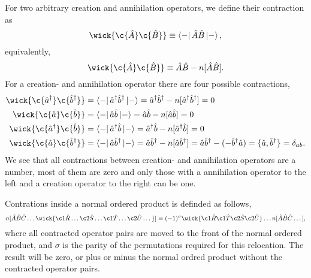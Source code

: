         For two arbitrary creation and annihilation operators, we define their contraction
        as 
        \begin{equation}
            \wick{\c {\hat{A}} \c {\hat{B}} } \equiv \bra{-} \hat{A} \hat{B}\ket{-},
        \end{equation}
        equivalently,
        \begin{equation}
            \wick{\c {\hat{A}} \c {\hat{B}} } \equiv \hat{A}\hat{B} - n[\hat{A} \hat{B}].
        \end{equation}
        For a creation- and annihilation operator there are four possible contractions,
        \begin{equation}
            \begin{aligned}
            \wick{\c{\hat{a}^\dagger} \c{\hat{b}^\dagger}} 
            &= \bra{-}\hat{a}^\dagger \hat{b}^\dagger \ket{-}
            = \hat{a}^\dagger \hat{b}^\dagger - n[\hat{a}^\dagger \hat{b}^\dagger]
            = 0 \\
            \wick{\c{\hat{a}} \c{\hat{b}}} 
            &= \bra{-}\hat{a} \hat{b} \ket{-}
            = \hat{a} \hat{b} - n[\hat{a} \hat{b}]
            = 0 \\
            \wick{\c{\hat{a}^\dagger} \c{\hat{b}}} 
            &= \bra{-}\hat{a}^\dagger \hat{b} \ket{-}
            = \hat{a}^\dagger \hat{b} - n[\hat{a}^\dagger \hat{b}]
            = 0 \\
            \wick{\c{\hat{a}} \c{\hat{b}^\dagger}} 
            &= \bra{-}\hat{a} \hat{b}^\dagger \ket{-}
            = \hat{a} \hat{b}^\dagger - n[\hat{a} \hat{b}^\dagger]
            = \hat{a} \hat{b}^\dagger - (- \hat{b}^\dagger\hat{a})
            = \{\hat{a}, \hat{b}^\dagger \} = \delta_{ab}.
            \end{aligned}
        \end{equation}
        We see that all contractions between creation- and annihilation operators
        are a number, most of them are zero and only those with a annihilation operator
        to the left and a creation operator to the right can be one.
       
		Contrations inside a normal ordered product is definded as follows,
		\begin{equation}
			n[\hat{A}\hat{B}\hat{C} \dots 
			\wick{\c1{\hat{R}} \dots \c2{\hat{S}} \dots 
					\c1{\hat{T}} \dots \c2{\hat{U}} \dots}]
			= (-1)^{\sigma} \wick{\c1{\hat{R}} \c1{\hat{T}} \c2{\hat{S}} \c2{\hat{U}}}
				\dots n[\hat{A}\hat{B}\hat{C}\dots],
		\end{equation}
		where all contracted operator pairs are moved to the front of the normal ordered 
		product, and $\sigma$ is the parity of the permutations required for this relocation.
		The result will be zero, or plus or minus the normal ordred product without the
		contracted operator pairs.

